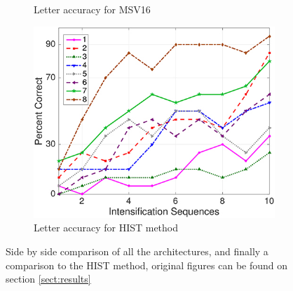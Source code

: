 \documentclass[conference]{IEEEtran}
\begin{document}
\begin{figure}[h]
\begin{subfigure}[t]{0.5\textwidth}
    \caption{Letter accuracy for MSV16 \label{image:v3intensification2}}
    \end{subfigure}
    \begin{subfigure}[t]{0.5\textwidth}
    \centering\captionsetup{width=.8\linewidth}
    \includegraphics[width=0.7\linewidth, keepaspectratio]{images/histintensification.jpg}
    \caption{Letter accuracy for HIST method \cite{ramele2019histogram} \label{image:histintensification}}
    \end{subfigure}
    
    \caption[Letter accuracy for all architectures ]{Side by side comparison of all the architectures, and finally a comparison to the HIST method, original figures can be found on section \ref{sect:results}}\label{image:allversionsiaccuracy}
\end{figure}
\end{document}
